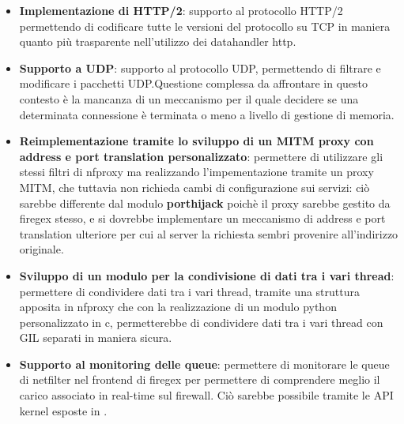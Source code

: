 \begin{itemize}
    \setlength{\itemsep}{2pt}
    \setlength{\parskip}{2pt}
    \item \textbf{Implementazione di HTTP/2}: supporto al protocollo HTTP/2 permettendo di codificare tutte le versioni del protocollo su TCP in maniera
    quanto più trasparente nell'utilizzo dei datahandler http.
    \item \textbf{Supporto a UDP}: supporto al protocollo UDP, permettendo di filtrare e modificare i pacchetti UDP.\@ Questione complessa da affrontare
    in questo contesto è la mancanza di un meccanismo per il quale decidere se una determinata connessione è terminata o meno a livello di gestione di memoria.
    \item \textbf{Reimplementazione tramite lo sviluppo di un MITM proxy con address e port translation personalizzato}: permettere di utilizzare gli stessi filtri di nfproxy
    ma realizzando l'impementazione tramite un proxy MITM, che tuttavia non richieda cambi di configurazione sui servizi: ciò sarebbe differente dal
    modulo \textbf{porthijack} poichè il proxy sarebbe gestito da firegex stesso, e si dovrebbe implementare un meccanismo di address e port translation
    ulteriore per cui al server la richiesta sembri provenire all'indirizzo originale.
    \item \textbf{Sviluppo di un modulo per la condivisione di dati tra i vari thread}: permettere di condividere dati tra i vari thread, tramite una struttura apposita in nfproxy
    che con la realizzazione di un modulo python personalizzato in c, permetterebbe di condividere dati tra i vari thread con GIL separati in maniera sicura.
    \item \textbf{Supporto al monitoring delle queue}: permettere di monitorare le queue di netfilter nel frontend di firegex per permettere di comprendere
    meglio il carico associato in real-time sul firewall. Ciò sarebbe possibile tramite le API kernel esposte in .
\end{itemize}

